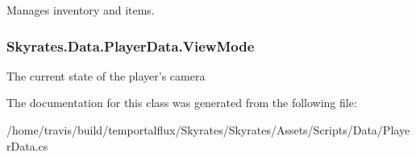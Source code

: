 Manages inventory and items. 

\hypertarget{class_skyrates_1_1_data_1_1_player_data_a254a2270ea477c0841176b3797222f2a}{
\subsubsection[{View\-Mode}]{ Skyrates.\-Data.\-Player\-Data.\-View\-Mode}}\label{class_skyrates_1_1_data_1_1_player_data_a254a2270ea477c0841176b3797222f2a}


The current state of the player's camera 



The documentation for this class was generated from the following file\-:\begin{DoxyCompactItemize}
\item 
/home/travis/build/temportalflux/\-Skyrates/\-Skyrates/\-Assets/\-Scripts/\-Data/Player\-Data.\-cs\end{DoxyCompactItemize}
